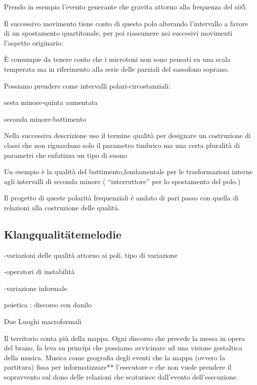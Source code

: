 Prendo in esempio l’evento generante che gravita attorno alla frequenza del si{\large$\flat$}5.

Il successivo movimento tiene conto di questo polo alterando l’intervallo a favore
di un spostamento quartitonale, per poi riassumere nei succesivi movimenti l’aspetto originario:

È comunque da tenere conto che i microtoni non sono pensati su una scala temperata ma
in riferimento alla serie delle parziali del sassofono soprano.

Possiamo prendere come intervalli polari-circostanziali:

\begin{center}
sesta minore-quinta aumentata
\end{center}

\begin{center}
seconda minore-battimento
\end{center}

Nella successiva descrizione uso il termine qualità per designare un costruzione di classi che non riguardano solo il parametro timbrico ma una certa  pluralità di parametri che enfatizza un tipo di suono

Un esempio è la qualità  del battimento,fondamentale per le trasformazioni interne agli intervalli di seconda minore ( “interruttore” per lo spostamento del polo.)

Il progetto di queste polarità frequenziali è andato di pari passo con quella di
relazioni alla costruzione delle qualità.

\subsection{Klangqualitätemelodie}

-variazioni delle qualità attorno ai poli. tipo di variazione

-operatori di instabilità

-variazione informale

 poietica : discorso con danilo

Due Luoghi macroformali

Il territorio conta più della mappa.
Ogni discorso che precede la messa in opera del brano, fa leva su principi che possiamo avvicinare ad una visione gestaltica della musica.
Musica come geografia degli eventi che la mappa (ovvero la partitura) fissa per informatizzare** l'esecutore e  che non vuole prendere il sopravvento sul dono delle relazioni che scaturisce dall'evento dell'esecuzione.

